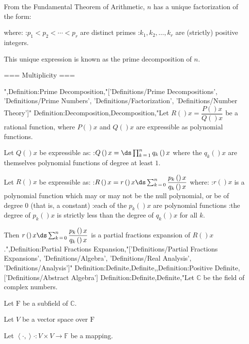 From the Fundamental Theorem of Arithmetic, $n$ has a unique factorization of the form:






where:
:$p_1 < p_2 < \cdots < p_r$ are distinct primes
:$k_1, k_2, \ldots, k_r$ are (strictly) positive integers.


This unique expression is known as the prime decomposition of $n$.


=== Multiplicity ===

",Definition:Prime Decomposition,"['Definitions/Prime Decompositions', 'Definitions/Prime Numbers', 'Definitions/Factorization', 'Definitions/Number Theory']"
Definition:Decomposition,Decomposition,"Let $R \left(   \right)x = \dfrac {P \left(   \right)x} {Q \left(   \right)x}$ be a rational function, where $P \left(   \right)x$ and $Q \left(   \right)x$ are expressible as polynomial functions.

Let $Q \left(   \right)x$ be expressible as:
:$Q \left(   \right)x = \ds \prod_{k \mathop = 1}^n q_k \left(   \right)x$
where the $q_k \left(   \right)x$ are themselves polynomial functions of degree at least $1$.


Let $R \left(   \right)x$ be expressible as:
:$R \left(   \right)x = r \left(   \right)x \ds \sum_{k \mathop = 0}^n \dfrac {p_k \left(   \right)x} {q_k \left(   \right)x}$
where:
:$r \left(   \right)x$ is a polynomial function which may or may not be the null polynomial, or be of degree $0$ (that is, a constant)
:each of the $p_k \left(   \right)x$ are polynomial functions
:the degree of $p_k \left(   \right)x$ is strictly less than the degree of $q_k \left(   \right)x$ for all $k$.


Then $r \left(   \right)x \ds \sum_{k \mathop = 0}^n \dfrac {p_k \left(   \right)x} {q_k \left(   \right)x}$ is a partial fractions expansion of $R \left(   \right)x$.",Definition:Partial Fractions Expansion,"['Definitions/Partial Fractions Expansions', 'Definitions/Algebra', 'Definitions/Real Analysis', 'Definitions/Analysis']"
Definition:Definite,Definite,,Definition:Positive Definite,['Definitions/Abstract Algebra']
Definition:Definite,Definite,"Let $\mathbb C$ be the field of complex numbers.

Let $\mathrm F$ be a subfield of $\mathbb C$.

Let $V$ be a vector space over $\mathrm F$

Let $\left\langle \cdot,   \right\rangle\cdot: V \times V \to \mathbb F$ be a mapping.


